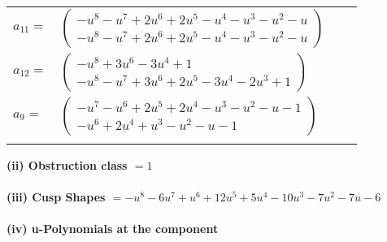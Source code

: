 \documentclass[1p]{elsarticle_modified}
\theoremstyle{definition}
\begin{document}
\begin{tabular}{m{7pt} m{180pt} m{7pt} m{180pt} }
\flushright $a_{11}=$&$\begin{pmatrix}- u^8- u^7+2 u^6+2 u^5- u^4- u^3- u^2- u\\- u^8- u^7+2 u^6+2 u^5- u^4- u^3- u^2- u\end{pmatrix}$ \\
\flushright $a_{12}=$&$\begin{pmatrix}- u^8+3 u^6-3 u^4+1\\- u^8- u^7+3 u^6+2 u^5-3 u^4-2 u^3+1\end{pmatrix}$ \\
\flushright $a_{9}=$&$\begin{pmatrix}- u^7- u^6+2 u^5+2 u^4- u^3- u^2- u-1\\- u^6+2 u^4+u^3- u^2- u-1\end{pmatrix}$\\&\end{tabular}
\flushleft \textbf{(ii) Obstruction class $= 1$}\\~\\
\flushleft \textbf{(iii) Cusp Shapes $= - u^8-6 u^7+u^6+12 u^5+5 u^4-10 u^3-7 u^2-7 u-6$}\\~\\
\newpage\renewcommand{\arraystretch}{1}
\flushleft \textbf{(iv) u-Polynomials at the component}\newline \\
\end{document}
